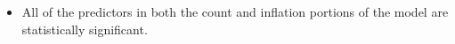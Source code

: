 \documentclass[MASTER.tex]{subfiles}
\begin{document}
\begin{frame}[fragile]
	\begin{itemize}
		\item	All of the predictors in both the count and inflation portions of the model are statistically significant. 
	\end{itemize}
\end{frame}

%	
%	
\end{document}
